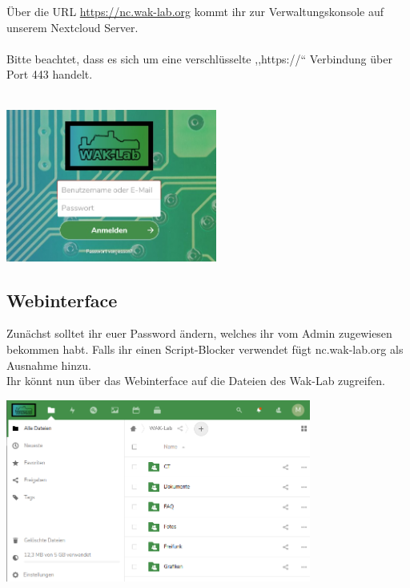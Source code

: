 Über die URL \url{https://nc.wak-lab.org} kommt ihr zur Verwaltungskonsole auf unserem Nextcloud Server. \\
\ \\
Bitte beachtet, dass es sich um eine verschlüsselte ,,https://`` Verbindung über Port 443 handelt.\\
\ \\
\begin{minipage}[t]{\textwidth}
  \centering
  \includegraphics[height=5cm]{pictures/Nextcloudlogin.jpg}
  \label{img:Nextcloudlogin}
\end{minipage}

\subsection{Webinterface}
Zunächst solltet ihr euer Password ändern, welches ihr vom Admin zugewiesen bekommen habt. Falls ihr einen Script-Blocker verwendet fügt nc.wak-lab.org als Ausnahme hinzu.\\
Ihr könnt nun über das Webinterface auf die Dateien des Wak-Lab zugreifen.\\
 
\begin{minipage}[t]{\textwidth}
  \centering
  \includegraphics[height=6cm]{pictures/NextcloudWebinterface.png}
  \label{img:NextcloudWebinterface}
\end{minipage}


